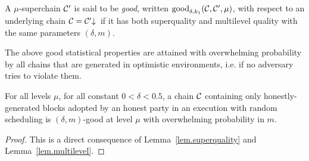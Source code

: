 \begin{definition}\label{lem.good}
A $\mu$-superchain $\mathcal{C}'$ is said to be \textit{good}, written
$\textnormal{good}_{\delta, k_1}(\mathcal{C}, \mathcal{C}', \mu)$, with respect to an
underlying chain $\mathcal{C} = \mathcal{C}'\negthickspace\downarrow\,$ if it has both superquality and multilevel quality with the same parameters $(\delta, m)$.
\end{definition}

The above good statistical properties are attained with overwhelming probability
by all chains that are generated in optimistic environments, i.e. if no
adversary tries to violate them.

\begin{lemma}
\label{lem.superchain-distribution}
For all levels $\mu$, for all constant $0 < \delta < 0.5$, a chain
$\mathcal{C}$ containing only honestly-generated blocks adopted by an honest party in
an execution with random scheduling is $(\delta, m)$-good at level
$\mu$ with overwhelming probability in $m$.
\end{lemma}
\ifonecolumn
\begin{proof}
This is a direct consequence of Lemma~\ref{lem.superquality} and
Lemma~\ref{lem.multilevel}. \Qed
\end{proof}
\fi

